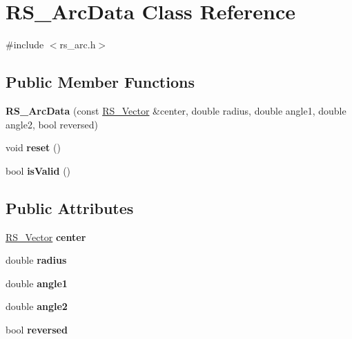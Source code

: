 \hypertarget{classRS__ArcData}{\section{R\-S\-\_\-\-Arc\-Data Class Reference}
\label{classRS__ArcData}
}


{\ttfamily \#include $<$rs\-\_\-arc.\-h$>$}

\subsection*{Public Member Functions}
\begin{DoxyCompactItemize}
\item 
\hypertarget{classRS__ArcData_a150343624b82ae52870b360aab97b5c6}{{\bfseries R\-S\-\_\-\-Arc\-Data} (const \hyperlink{classRS__Vector}{R\-S\-\_\-\-Vector} \&center, double radius, double angle1, double angle2, bool reversed)}\label{classRS__ArcData_a150343624b82ae52870b360aab97b5c6}

\item 
\hypertarget{classRS__ArcData_a58a968e856c6271599c506db22a3512b}{void {\bfseries reset} ()}\label{classRS__ArcData_a58a968e856c6271599c506db22a3512b}

\item 
\hypertarget{classRS__ArcData_acf0108393d2871469c8e143b45bde88c}{bool {\bfseries is\-Valid} ()}\label{classRS__ArcData_acf0108393d2871469c8e143b45bde88c}

\end{DoxyCompactItemize}
\subsection*{Public Attributes}
\begin{DoxyCompactItemize}
\item 
\hypertarget{classRS__ArcData_a9e8f7a77a60b662b84fcb3cff5af3634}{\hyperlink{classRS__Vector}{R\-S\-\_\-\-Vector} {\bfseries center}}\label{classRS__ArcData_a9e8f7a77a60b662b84fcb3cff5af3634}

\item 
\hypertarget{classRS__ArcData_a71a5a262e6d9f59d89a16f97a39ba562}{double {\bfseries radius}}\label{classRS__ArcData_a71a5a262e6d9f59d89a16f97a39ba562}

\item 
\hypertarget{classRS__ArcData_a4d8201f6ecb109a2fccf1185df3689aa}{double {\bfseries angle1}}\label{classRS__ArcData_a4d8201f6ecb109a2fccf1185df3689aa}

\item 
\hypertarget{classRS__ArcData_a87b35df714454db8549bc8e5190f1e91}{double {\bfseries angle2}}\label{classRS__ArcData_a87b35df714454db8549bc8e5190f1e91}

\item 
\hypertarget{classRS__ArcData_a6f4ae85fb64896b834fcea80e50ab9ad}{bool {\bfseries reversed}}\label{classRS__ArcData_a6f4ae85fb64896b834fcea80e50ab9ad}

\end{DoxyCompactItemize}
